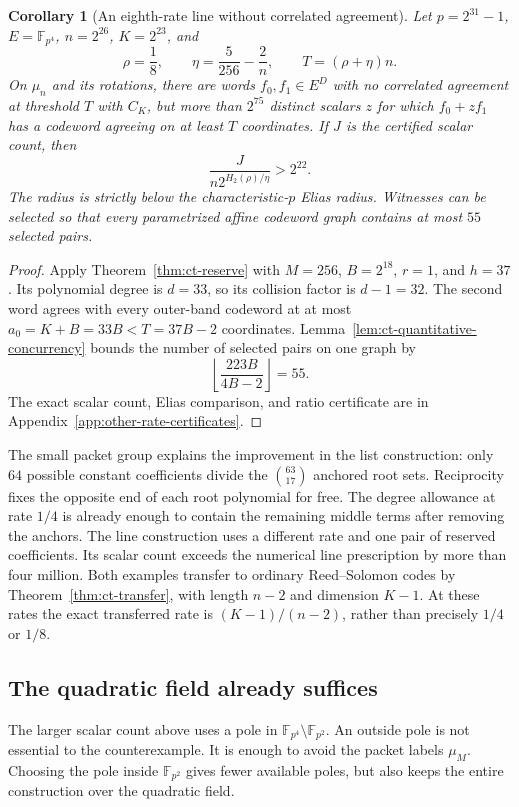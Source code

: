 \documentclass[11pt,letterpaper]{article}
\newtheorem{corollary}[theorem]{Corollary}
\theoremstyle{definition}
\theoremstyle{remark}
\newcommand{\F}{\mathbb F}
\begin{document}
\begin{corollary}[An eighth-rate line without correlated agreement]
\label{cor:eighth-line}
Let $p=2^{31}-1$, $E=\F_{p^4}$, $n=2^{26}$, $K=2^{23}$, and
\[
 \rho=\frac18,\qquad \eta=\frac5{256}-\frac2n,
 \qquad T=(\rho+\eta)n.
\]
On $\mu_n$ and its rotations, there are words $f_0,f_1\in E^D$
with no correlated agreement at threshold $T$ with $C_K$, but more
than $2^{75}$ distinct scalars $z$ for which $f_0+zf_1$ has a codeword
agreeing on at least $T$ coordinates. If $J$ is the certified scalar
count, then
\[
 \frac{J}{n2^{H_2(\rho)/\eta}}>2^{22}.
\]
The radius is strictly below the characteristic-$p$ Elias radius.
Witnesses can be selected so that every parametrized affine codeword
graph contains at most $55$ selected pairs.
\end{corollary}
\begin{proof}
Apply Theorem~\ref{thm:ct-reserve} with $M=256$, $B=2^{18}$, $r=1$,
and $h=37$. Its polynomial degree is $d=33$, so its collision factor
is $d-1=32$. The second word agrees with every outer-band codeword
at at most $a_0=K+B=33B<T=37B-2$ coordinates.
Lemma~\ref{lem:ct-quantitative-concurrency} bounds the number of
selected pairs on one graph by
\[
 \left\lfloor\frac{223B}{4B-2}\right\rfloor=55.
\]
The exact scalar count, Elias comparison, and ratio certificate are
in Appendix~\ref{app:other-rate-certificates}.
\end{proof}

The small packet group explains the improvement in the list construction: only $64$ possible
constant coefficients divide the $\binom{63}{17}$ anchored root sets.
Reciprocity fixes the opposite end of each root polynomial for free.
The degree allowance at rate $1/4$ is already enough to contain the
remaining middle terms after removing the anchors. The line construction
uses a different rate and one pair of reserved coefficients. Its scalar
count exceeds the numerical line prescription by more than four million.
Both examples transfer to ordinary Reed--Solomon codes by
Theorem~\ref{thm:ct-transfer}, with length $n-2$ and dimension $K-1$.
At these rates the exact transferred rate is $(K-1)/(n-2)$, rather
than precisely $1/4$ or $1/8$.

\subsection{The quadratic field already suffices}

The larger scalar count above uses a pole in $\F_{p^4}\setminus\F_{p^2}$.
An outside pole is not essential to the counterexample. It is enough
to avoid the packet labels $\mu_M$. Choosing the pole inside
$\F_{p^2}$ gives fewer available poles, but also keeps the entire
construction over the quadratic field.
\end{document}
